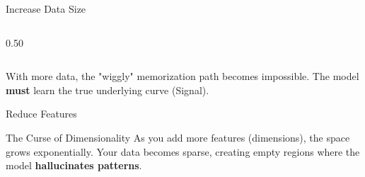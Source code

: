 \begin{frame}{Increase Data Size}
\begin{columns}[T]
\begin{column}{0.50\textwidth}
        \end{column}
    \end{columns}
    
    \begin{tcolorbox}[colback=green!5, colframe=green!40]
        \centering
        With more data, the "wiggly" memorization path becomes impossible. The model \textbf{must} learn the true underlying curve (Signal).
    \end{tcolorbox}
\end{frame}


\begin{frame}{Reduce Features}

    \begin{alertblock}{The Curse of Dimensionality}
        As you add more features (dimensions), the space grows exponentially. Your data becomes sparse, creating empty regions where the model \textbf{hallucinates patterns}.
    \end{alertblock}
\end{frame}

